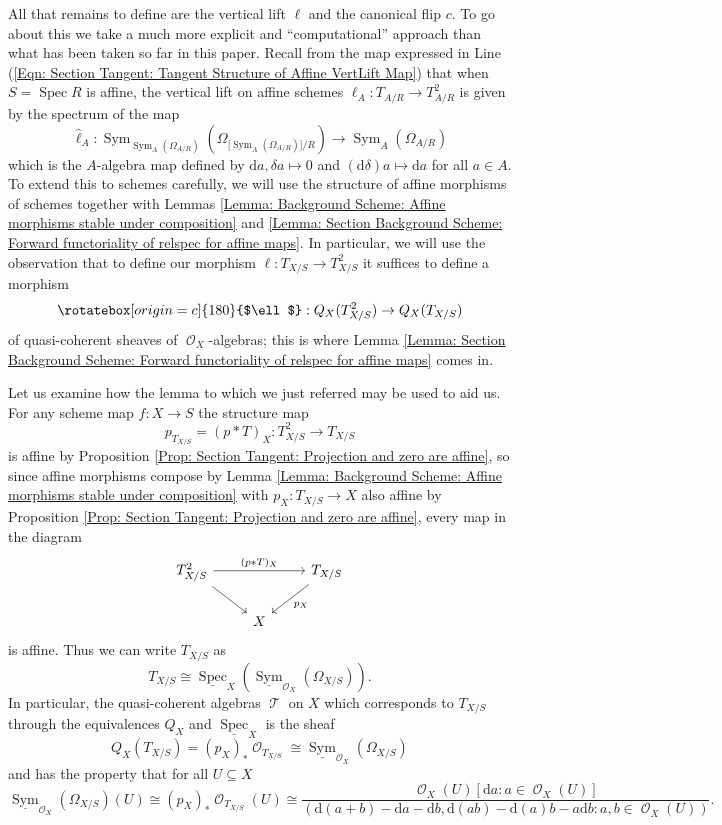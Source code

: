 \documentclass{amsart}
\theoremstyle{definition}
\DeclareMathOperator{\Tscr}{\mathscr{T}}
\DeclareMathOperator{\Ocal}{\mathcal{O}}
\DeclareMathOperator{\sym}{Sym}
\DeclareMathOperator{\Spec}{Spec}
\newcommand{\Sym}[1]{\sym_{#1}}
\newcommand{\RelSpec}[1]{\underline{\Spec}_{#1}}
\newcommand{\RelSym}[1]{\underline{\sym}_{{#1}}}
\newcommand{\Kah}[2]{\Omega_{{#1}/{#2}}}
\numberwithin{equation}{subsection}
\begin{document}
All that remains to define are the vertical lift $\ell$ and the canonical flip $c$. To go about this we take a much more explicit and ``computational'' approach than what has been taken so far in this paper. Recall from the map expressed in Line (\ref{Eqn: Section Tangent: Tangent Structure of Affine VertLift Map}) that when $S = \Spec R$ is affine, the vertical lift on affine schemes $\ell_A:T_{A/R} \to T^2_{A/R}$ is given by the spectrum of the map
\[
\hat{\ell}_A:\Sym{\Sym{A}(\Kah{A}{R})}\left(\Kah{\big[\Sym{A}(\Kah{A}{R})\big]}{R}\right) \longrightarrow \Sym{A}\left(\Kah{A}{R}\right)
\]
which is the $A$-algebra map defined by $\mathrm{d}a, \delta a \mapsto 0$ and $(\mathrm{d}\delta)a \mapsto \mathrm{d}a$ for all $a \in A$. To extend this to schemes carefully, we will use the structure of affine morphisms of schemes together with Lemmas \ref{Lemma: Background Scheme: Affine morphisms stable under composition} and \ref{Lemma: Section Background Scheme: Forward functoriality of relspec for affine maps}. In particular, we will use the observation that to define our morphism $\ell:T_{X/S} \to T^2_{X/S}$ it suffices to define a morphism
\[
\rotatebox[origin = c]{180}{$\ell$}:Q_{X}(T^2_{X/S}) \to Q_{X}(T_{X/S})
\]
of quasi-coherent sheaves of $\Ocal_X$-algebras; this is where Lemma \ref{Lemma: Section Background Scheme: Forward functoriality of relspec for affine maps} comes in.

Let us examine how the lemma to which we just referred may be used to aid us. For any scheme map $f:X \to S$ the structure map 
\[
p_{T_{X/S}} = (p \ast T)_{X}:T_{X/S}^2 \to T_{X/S}
\]
is affine by Proposition \ref{Prop: Section Tangent: Projection and zero are affine}, %
so since affine morphisms compose by Lemma \ref{Lemma: Background Scheme: Affine morphisms stable under composition}  with $p_X:T_{X/S} \to X$ also affine by Proposition \ref{Prop: Section Tangent: Projection and zero are affine}, every map in the diagram
\[
\begin{tikzcd}
T^2_{X/S} \ar[dr] \ar[rr]{}{(p \ast T)_X} & & T_{X/S} \ar[dl]{}{p_X} \\
 & X
\end{tikzcd}
\] 
is affine. Thus we can write $T_{X/S}$ as
\[
T_{X/S} \cong \RelSpec{X}\left(\RelSym{\Ocal_X}(\Kah{X}{S})\right).
\]
In particular, the quasi-coherent algebras $\Tscr$ on $X$ which corresponds to $T_{X/S}$ through the equivalences $Q_X$ and $\RelSpec{X}$ is the sheaf
\[
Q_X(T_{X/S}) = (p_X)_{\ast}\Ocal_{T_{X/S}} \cong \RelSym{\Ocal_X}\left(\Kah{X}{S}\right)
\]
and has the property that for all $U \subseteq X$
\[
\RelSym{\Ocal_X}\left(\Kah{X}{S}\right)(U) \cong (p_X)_{\ast}\Ocal_{T_{X/S}}(U) \cong \frac{\Ocal_X(U)[\mathrm{d}a:a \in \Ocal_X(U)]}{(\mathrm{d}(a+b) - \mathrm{d}a - \mathrm{d}b, \mathrm{d}(ab) - \mathrm{d}(a)b - a\mathrm{d}b:a,b \in \Ocal_X(U))}.
\]
\end{document}
